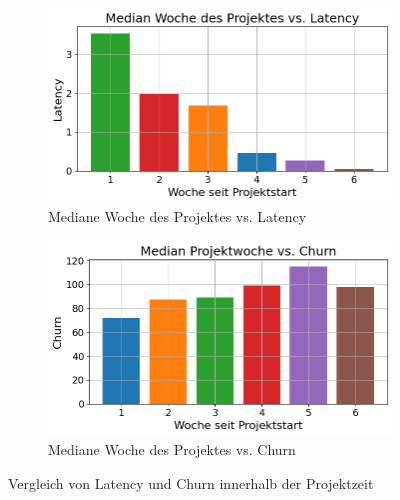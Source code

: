 \begin{figure}[htbp]
    \centering
    \begin{subfigure}[b]{0.48\textwidth}
        \centering
        \includegraphics[width=\textwidth]{Figures/mittelwert-woche-lateny.png}
        \caption{Mediane Woche des Projektes vs. Latency}
        \label{fig:mittelwert-woche-lateny}
    \end{subfigure}
    \hfill
    \begin{subfigure}[b]{0.48\textwidth}
        \centering
        \includegraphics[width=\textwidth]{Figures/mittelwert-woche-churn.png}
        \caption{Mediane Woche des Projektes vs. Churn}
        \label{fig:mittelwert-woche-churn}
    \end{subfigure}
    \caption{Vergleich von Latency und Churn innerhalb der Projektzeit}
    \label{fig:vergleich-latency-churn-projektzeit}
\end{figure}

